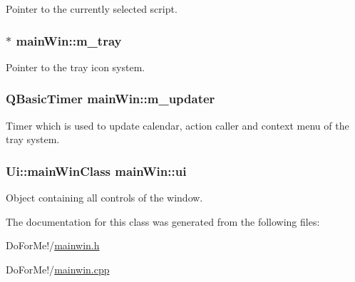 Pointer to the currently selected script. 

\hypertarget{classmain_win_a13f687f63460e13e6a4819ea1496a2f0}{
\subsubsection[{m\-\_\-tray}]{$\ast$ main\-Win\-::m\-\_\-tray\hspace{0.3cm}{\ttfamily [private]}}}\label{classmain_win_a13f687f63460e13e6a4819ea1496a2f0}


Pointer to the tray icon system. 

\hypertarget{classmain_win_a079d09aeafe1af36f8f0d1bd4d88d803}{
\subsubsection[{m\-\_\-updater}]{\setlength{\rightskip}{0pt plus 5cm}Q\-Basic\-Timer main\-Win\-::m\-\_\-updater\hspace{0.3cm}{\ttfamily [private]}}}\label{classmain_win_a079d09aeafe1af36f8f0d1bd4d88d803}


Timer which is used to update calendar, action caller and context menu of the tray system. 

\hypertarget{classmain_win_a89fa9d3006573378f3195845fe9ed408}{
\subsubsection[{ui}]{\setlength{\rightskip}{0pt plus 5cm}Ui\-::main\-Win\-Class main\-Win\-::ui\hspace{0.3cm}{\ttfamily [private]}}}\label{classmain_win_a89fa9d3006573378f3195845fe9ed408}


Object containing all controls of the window. 



The documentation for this class was generated from the following files\-:\begin{DoxyCompactItemize}
\item 
Do\-For\-Me!/\hyperlink{mainwin_8h}{mainwin.\-h}\item 
Do\-For\-Me!/\hyperlink{mainwin_8cpp}{mainwin.\-cpp}\end{DoxyCompactItemize}
